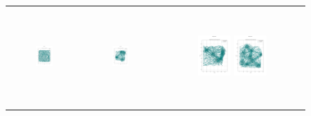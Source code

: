 \begin{figure}[p]
\begin{tabular}{ccc}
        \includegraphics[height=36mm,width=0.24\textwidth]{Images/simulation_no_obs/straight_paths/21.png}
        & \includegraphics[height=36mm,width=0.24\textwidth]{Images/simulation_no_obs/straight_paths/22.png}
        & \includegraphics[height=36mm,width=0.24\textwidth]{Images/simulation_no_obs/straight_paths/23.png}
         \includegraphics[height=36mm,width=0.24\textwidth]{Images/simulation_no_obs/straight_paths/24.png}\\[-4pt]


\end{tabular}
\end{figure}
